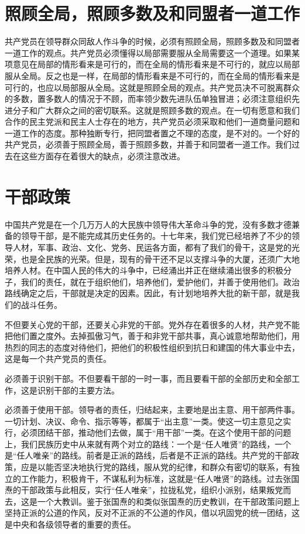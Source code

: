 \section{照顾全局，照顾多数及和同盟者一道工作}

共产党员在领导群众同敌人作斗争的时候，必须有照顾全局，照顾多数及和同盟者一道工作的观点。共产党员必须懂得以局部需要服从全局需要这一个道理。如果某项意见在局部的情形看来是可行的，而在全局的情形看来是不可行的，就应以局部服从全局。反之也是一样，在局部的情形看来是不可行的，而在全局的情形看来是可行的，也应以局部服从全局。这就是照顾全局的观点。共产党员决不可脱离群众的多数，置多数人的情况于不顾，而率领少数先进队伍单独冒进；必须注意组织先进分子和广大群众之间的密切联系。这就是照顾多数的观点。在一切有愿意和我们合作的民主党派和民主人士存在的地方，共产党员必须采取和他们一道商量问题和一道工作的态度。那种独断专行，把同盟者置之不理的态度，是不对的。一个好的共产党员，必须善于照顾全局，善于照顾多数，并善于和同盟者一道工作。我们过去在这些方面存在着很大的缺点，必须注意改进。

\section{干部政策}

中国共产党是在一个几万万人的大民族中领导伟大革命斗争的党，没有多数才德兼备的领导干部，是不能完成其历史任务的。十七年来，我们党已经培养了不少的领导人材，军事、政治、文化、党务、民运各方面，都有了我们的骨干，这是党的光荣，也是全民族的光荣。但是，现有的骨干还不足以支撑斗争的大厦，还须广大地培养人材。在中国人民的伟大的斗争中，已经涌出并正在继续涌出很多的积极分子，我们的责任，就在于组织他们，培养他们，爱护他们，并善于使用他们。政治路线确定之后，干部就是决定的因素。因此，有计划地培养大批的新干部，就是我们的战斗任务。

不但要关心党的干部，还要关心非党的干部。党外存在着很多的人材，共产党不能把他们置之度外。去掉孤傲习气，善于和非党干部共事，真心诚意地帮助他们，用热烈的同志的态度对待他们，把他们的积极性组织到抗日和建国的伟大事业中去，这是每一个共产党员的责任。

必须善于识别干部。不但要看干部的一时一事，而且要看干部的全部历史和全部工作，这是识别干部的主要方法。

必须善于使用干部。领导者的责任，归结起来，主要地是出主意、用干部两件事。一切计划、决议、命令、指示等等，都属于“出主意”一类。使这一切主意见之实行，必须团结干部，推动他们去做，属于“用干部”一类。在这个使用干部的问题上，我们民族历史中从来就有两个对立的路线：一个是“任人唯贤”的路线，一个是“任人唯亲”的路线。前者是正派的路线，后者是不正派的路线。共产党的干部政策，应是以能否坚决地执行党的路线，服从党的纪律，和群众有密切的联系，有独立的工作能力，积极肯干，不谋私利为标准，这就是“任人唯贤”的路线。过去张国焘的干部政策与此相反，实行“任人唯亲”，拉拢私党，组织小派别，结果叛党而去，这是一个大教训。鉴于张国焘的和类似张国焘的历史教训，在干部政策问题上坚持正派的公道的作风，反对不正派的不公道的作风，借以巩固党的统一团结，这是中央和各级领导者的重要的责任。

